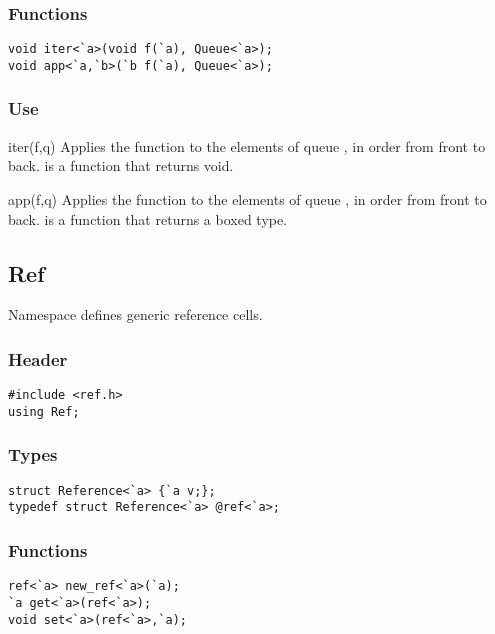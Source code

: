 \subsubsection*{Functions}
\begin{verbatim}
void iter<`a>(void f(`a), Queue<`a>);
void app<`a,`b>(`b f(`a), Queue<`a>);
\end{verbatim}

\subsubsection*{Use}

\begin{defun}{iter}{(f,q)}
Applies the function  to the elements of queue , in order
from front to back.   is a function that returns void.
\end{defun}

\begin{defun}{app}{(f,q)}
Applies the function  to the elements of queue , in order
from front to back.   is a function that returns a boxed type.
\end{defun}

\subsection{Ref}

Namespace  defines generic reference cells.

\subsubsection*{Header}
\begin{verbatim}
#include <ref.h>
using Ref;
\end{verbatim}

\subsubsection*{Types}
\begin{verbatim}
struct Reference<`a> {`a v;};
typedef struct Reference<`a> @ref<`a>;
\end{verbatim}

\subsubsection*{Functions}
\begin{verbatim}
ref<`a> new_ref<`a>(`a);
`a get<`a>(ref<`a>);
void set<`a>(ref<`a>,`a);
\end{verbatim}

